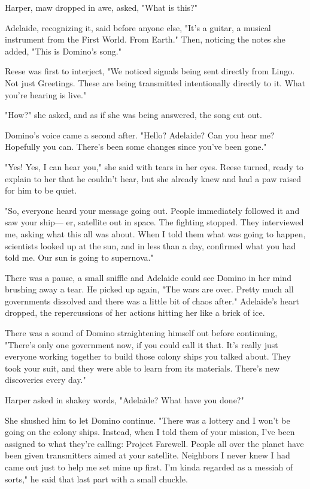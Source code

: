 Harper, maw dropped in awe, asked, "What is this?"

Adelaide, recognizing it, said before anyone else, "It's a guitar, a musical instrument from the First World. From Earth." Then, noticing the notes she added, "This is Domino's song."

Reese was first to interject, "We noticed signals being sent directly from Lingo. Not just Greetings. These are being transmitted intentionally directly to it. What you're hearing is live."

"How?" she asked, and as if she was being answered, the song cut out.

Domino's voice came a second after. "Hello? Adelaide? Can you hear me? Hopefully you can. There's been some changes since you've been gone."

"Yes! Yes, I can hear you," she said with tears in her eyes. Reese turned, ready to explain to her that he couldn't hear, but she already knew and had a paw raised for him to be quiet.

"So, everyone heard your message going out. People immediately followed it and saw your ship--- er, satellite out in space. The fighting stopped. They interviewed me, asking what this all was about. When I told them what was going to happen, scientists looked up at the sun, and in less than a day, confirmed what you had told me. Our sun is going to supernova."

There was a pause, a small sniffle and Adelaide could see Domino in her mind brushing away a tear. He picked up again, "The wars are over. Pretty much all governments dissolved and there was a little bit of chaos after." Adelaide's heart dropped, the repercussions of her actions hitting her like a brick of ice.

There was a sound of Domino straightening himself out before continuing, "There's only one government now, if you could call it that. It's really just everyone working together to build those colony ships you talked about. They took your suit, and they were able to learn from its materials. There's new discoveries every day."

Harper asked in shakey words, "Adelaide? What have you done?"

She shushed him to let Domino continue. "There was a lottery and I won't be going on the colony ships. Instead, when I told them of your mission, I've been assigned to what they're calling: Project Farewell. People all over the planet have been given transmitters aimed at your satellite. Neighbors I never knew I had came out just to help me set mine up first. I'm kinda regarded as a messiah of sorts," he said that last part with a small chuckle.

